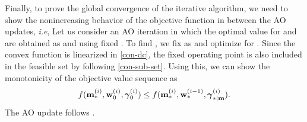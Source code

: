 Finally, to prove the global convergence of the iterative algorithm, we need to show the nonincreasing behavior of the objective function in between the \ac{AO} updates, \textit{i.e}, 
\iftoggle{single_column}{
\begin{equation}\allowdisplaybreaks
f(\iter{\mx}{\ast}{i},\iter{\my}{\ast}{i},\iter{\mz}{\ast|\mx}{i}) \leq f(\iter{\mx}{\ast}{i},\iter{\my}{0}{i},\iter{\mz}{0}{i}) \leq f(\iter{\mx}{\ast}{i},\iter{\my}{\ast}{i-1},\iter{\mz}{\ast|\my}{i}).
\end{equation}}{
\begin{multline}\allowdisplaybreaks
f(\iter{\mx}{\ast}{i},\iter{\my}{\ast}{i},\iter{\mz}{\ast|\mx}{i}) \leq f(\iter{\mx}{\ast}{i},\iter{\my}{0}{i},\iter{\mz}{0}{i}) \\
\leq f(\iter{\mx}{\ast}{i},\iter{\my}{\ast}{i-1},\iter{\mz}{\ast|\my}{i}).
\end{multline}}
Let us consider an \ac{AO} iteration  in which the optimal value for \eqn{\mx} and \eqn{\mz} are obtained as  and  using fixed . To find , we fix \eqn{\mx} as  and optimize for \me{\my}. Since the convex function is linearized in \eqref{con-dc}, the fixed operating point is also included in the feasible set  by following \eqref{con-sub-set}. Using this, we can show the monotonicity of the objective value sequence as
\begin{equation}
f({\mathbf{m}}_{\ast}^{(i)},{\mathbf{w}}_{0}^{(i)},{{\boldsymbol{\gamma}}}_{0}^{(i)}) \leq f({\mathbf{m}}_{\ast}^{(i)},{\mathbf{w}}_{\ast}^{(i-1)},{{\boldsymbol{\gamma}}}_{\ast|\mathbf{m}}^{(i)}).
\end{equation}
The \ac{AO} update follows . %

